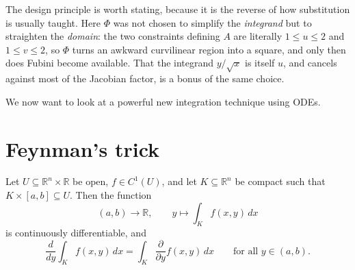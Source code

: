 \begin{ainote}
The design principle is worth stating, because it is the reverse of how substitution is usually
taught. Here $\Phi$ was not chosen to simplify the \emph{integrand} but to straighten the
\emph{domain}: the two constraints defining $A$ are literally $1 \leq u \leq 2$ and
$1 \leq v \leq 2$, so $\Phi$ turns an awkward curvilinear region into a square, and only then
does Fubini become available. That the integrand $y/\sqrt x$ is itself $u$, and cancels against
most of the Jacobian factor, is a bonus of the same choice.
\end{ainote}

We now want to look at a powerful new integration technique using ODEs.

\section{Feynman's trick}
\label{sec:feynmans_trick}

\begin{theorem}
\label{thm:feynmans_trick}
Let $U \subseteq \mathbb{R}^n\times\mathbb{R}$ be open, $f \in C^1(U)$, and let
$K \subseteq \mathbb{R}^n$ be compact such that $K\times[a,b] \subseteq U$. Then the function
\[(a,b) \to \mathbb{R}, \qquad y \mapsto \int_K f(x,y)\,dx\]
is continuously differentiable, and
\[\frac{d}{dy}\int_K f(x,y)\,dx = \int_K \frac{\partial}{\partial y}f(x,y)\,dx
\qquad \text{for all } y \in (a,b).\]
\end{theorem}

